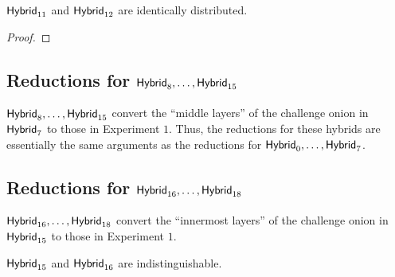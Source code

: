 \documentclass[runningheads,a4paper]{llncs}
\begin{document}
\begin{lemma}
$\mathsf{Hybrid}_{11}$ and $\mathsf{Hybrid}_{12}$ are identically distributed. 
\end{lemma}

\begin{proof}
\end{proof}
\fi

\subsection{Reductions for $\mathsf{Hybrid}_{8}, \dots, \mathsf{Hybrid}_{15}$}
$\mathsf{Hybrid}_{8}, \dots, \mathsf{Hybrid}_{15}$ convert the ``middle layers'' of the challenge onion in $\mathsf{Hybrid}_{7}$ to those in Experiment $1$. 
Thus, the reductions for these hybrids are essentially the same arguments as the reductions for $\mathsf{Hybrid}_{0}, \dots, \mathsf{Hybrid}_{7}$. 

\subsection{Reductions for $\mathsf{Hybrid}_{16}, \dots, \mathsf{Hybrid}_{18}$}
$\mathsf{Hybrid}_{16}, \dots, \mathsf{Hybrid}_{18}$ convert the ``innermost layers'' of the challenge onion in $\mathsf{Hybrid}_{15}$ to those in Experiment $1$. 

\begin{lemma}
$\mathsf{Hybrid}_{15}$ and $\mathsf{Hybrid}_{16}$ are indistinguishable. 
\end{lemma}
\end{document}
